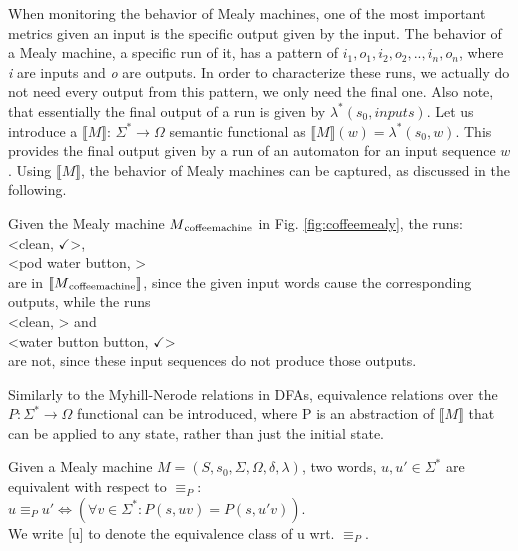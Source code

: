 When monitoring the behavior of Mealy machines, one of the most important metrics given an input is the specific output given by the input. The behavior of a Mealy machine, a specific run of it, has a pattern of \textit{$i_1,o_1,i_2,o_2,..,i_n,o_n$}, where \textit{i} are inputs and \textit{o} are outputs. In order to characterize these runs, we actually do not need every output from this pattern, we only need the final one. Also note, that essentially the final output of a run is given by $\lambda^*(s_0, inputs)$. Let us introduce a $\llbracket M\rrbracket$: $\Sigma^*\to\Omega$ semantic functional as  $\llbracket M\rrbracket(w) = \lambda^*(s_0, w)$. This provides the final output given by a run of an automaton for an input sequence $w$. Using $\llbracket M\rrbracket$, the behavior of Mealy machines can be captured, as discussed in the following.

\begin{example}
	Given the Mealy machine $M\textsubscript{coffeemachine}$ in Fig. \ref{fig:coffeemealy}, the runs:\\
	\null\qquad<clean, $\checkmark$>, \\
	\null\qquad<pod water button, \Coffeecup> \\
	are in $\llbracket M\textsubscript{coffeemachine}\rrbracket$, since the given input words cause the corresponding outputs, while the runs\\
	\null\qquad<clean, \Coffeecup> and \\
	\null\qquad<water button button, $\checkmark$> \\
	are not, since these input sequences do not produce those outputs.
\end{example}

Similarly to the Myhill-Nerode relations in DFAs, equivalence relations over the $P: \Sigma^*\to\Omega$ functional can be introduced, where P is an abstraction of  $\llbracket M\rrbracket$ that can be applied to any state, rather than just the initial state.

\begin{definition}
	Given a Mealy machine $M=(S,s_{0},\Sigma,\Omega,\delta,\lambda) $, two words, $u, u'\in\Sigma^*$ are equivalent with respect to $\equiv_P$:\\
	$u \equiv_P u' \iff (\forall v\in\Sigma^*:P(s, uv) = P(s, u'v))$.\\
	We write [u] to denote the equivalence class of u wrt. $\equiv_P$.
\end{definition}

